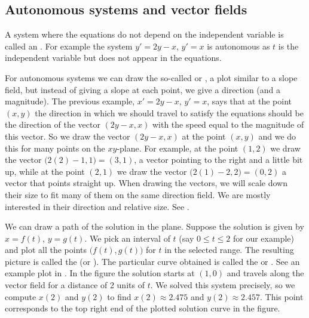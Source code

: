 \documentclass{ximera}
\begin{document}
\subsection{Autonomous systems and vector fields}

A system where the equations do not depend on the independent variable is called an \emph{}.  For example the system $y'=2y-x$, $y'=x$ is autonomous as $t$ is the independent variable but does not appear in the equations.

For autonomous systems we can draw the so-called \emph{} or \emph{}, a plot similar to a slope field, but instead of giving a slope at each point, we give a direction (and a magnitude).  The previous example, $x' = 2y-x$, $y' = x$, says that at the point $(x,y)$ the direction in which we should travel to satisfy the equations should be the direction of the vector $( 2y-x, x )$ with the speed equal to the magnitude of this vector.  So we draw the vector $(2y-x,x)$ at the point $(x,y)$ and we do this for many points on the $xy$-plane. For example, at the point $(1,2)$ we draw the vector $\bigl(2(2)-1,1\bigr) = (3,1)$, a vector pointing to the right and a little bit up, while at the point $(2,1)$ we draw the vector $\bigl(2(1)-2,2\bigr) = (0,2)$ a vector that points straight up. When drawing the vectors, we will scale down their size to fit many of them on the same direction field.  We are mostly interested in their direction and relative size.  See .

We can draw a path of the solution in the plane.  Suppose the solution is given by $x = f(t)$, $y=g(t)$.  We pick an interval of $t$ (say $0 \leq t \leq 2$ for our example) and plot all the points $\bigl(f(t),g(t)\bigr)$ for $t$ in the selected range.  The resulting picture is called the \emph{} (or ). The particular curve obtained is called the \emph{} or \emph{}. See an example plot in . In the figure the solution starts at $(1,0)$ and travels along the vector field for a distance of 2 units of $t$.  We solved this system precisely, so we compute $x(2)$ and $y(2)$ to find $x(2) \approx 2.475$ and $y(2) \approx 2.457$.  This point corresponds to the top right end of the plotted solution curve in the figure.

\begin{myfig}
    \parbox[t]{3.0in}{
        \capstart
        \caption{The direction field for $x' = 2y-x$, $y' = x$.%
        \label{sintro-vectorfield:fig}}
    }
    \quad
    \parbox[t]{3.0in}{
        \capstart
        \caption{The direction field for $x' = 2y-x$, $y' = x$ with the trajectory of the solution starting at $(1,0)$ for $0 \leq t \leq 2$.%
        \label{sintro-vectorfield-sol:fig}}
    }
\end{myfig}
\end{document}
